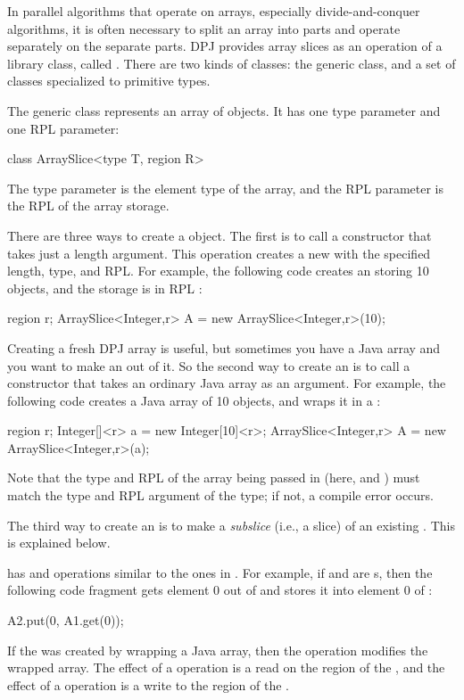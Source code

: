 In parallel algorithms that operate on arrays, especially
divide-and-conquer algorithms, it is often necessary to split an array
into parts and operate separately on the separate parts.  DPJ provides
array slices as an operation of a library class, called
.  There are two kinds of  classes:
the generic  class, and a set of 
classes specialized to primitive types.

 The generic  class
represents an array of objects.  It has one type parameter and one RPL
parameter:
%
\begin{dpjlisting}
class ArraySlice<type T, region R>
\end{dpjlisting}
%
The type parameter is the element type of the array, and the RPL
parameter is the RPL of the array storage.

 There are three ways to create a
 object.  The first is to call a constructor that
takes just a length argument.  This operation creates a new
 with the specified length, type, and RPL.  For
example, the following code creates an  storing 10
 objects, and the storage is in RPL :
%
\begin{dpjlisting}
region r;
ArraySlice<Integer,r> A = new ArraySlice<Integer,r>(10);
\end{dpjlisting}
%

Creating a fresh DPJ array is useful, but sometimes you have a Java
array and you want to make an  out of it.  So the second
way to create an  is to call a constructor that takes an
ordinary Java array as an argument.  For example, the following code
creates a Java array of 10  objects, and wraps it in a
:
%
\begin{dpjlisting}
region r;
Integer[]<r> a = new Integer[10]<r>;
ArraySlice<Integer,r> A = new ArraySlice<Integer,r>(a);
\end{dpjlisting}
%
Note that the type and RPL of the array being passed in (here,
 and ) must match the type and RPL argument of the
 type; if not, a compile error occurs.

The third way to create an  is to make a \emph{subslice}
(i.e., a slice) of an existing .  This is explained
below.

  has  and
 operations similar to the ones in .
For example, if  and  are s, then the
following code fragment gets element 0 out of  and stores it
into element 0 of :
%
\begin{dpjlisting}
A2.put(0, A1.get(0));
\end{dpjlisting}
%
If the  was created by wrapping a Java array, then the
 operation modifies the wrapped array.  The effect of a
 operation is a read on the region of the , and
the effect of a  operation is a write to the region of the
.

